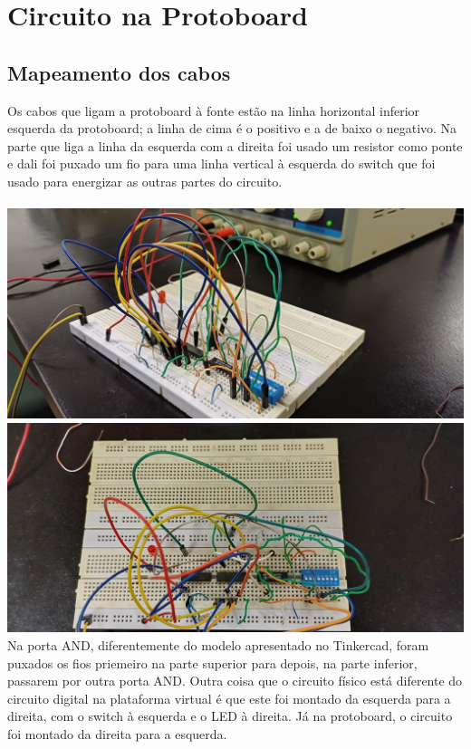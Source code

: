 \documentclass[]{article}
\begin{document}
	\section{Circuito na Protoboard}
		\subsection{Mapeamento dos cabos}
			Os cabos que ligam a protoboard à fonte estão na linha horizontal inferior esquerda da protoboard; a linha de cima é o positivo e a de baixo o negativo. Na parte que liga a linha da esquerda com a direita foi usado um resistor como ponte e dali foi puxado um fio para uma linha vertical à esquerda do switch que foi usado para energizar as outras partes do circuito. \\ \\
			\includegraphics[scale=0.25]{Images/Protoboard Side.jpeg} \\
			\includegraphics[scale=0.25]{Images/Protoboard Top.jpeg} \pagebreak\\
			Na porta AND, diferentemente do modelo apresentado no Tinkercad, foram puxados os fios priemeiro na parte superior para depois, na parte inferior, passarem por outra porta AND. Outra coisa que o circuito físico está diferente do circuito digital na plataforma virtual é que este foi montado da esquerda para a direita, com o switch à esquerda e o LED à direita. Já na protoboard, o circuito foi montado da direita para a esquerda. \\ \\
\end{document}
